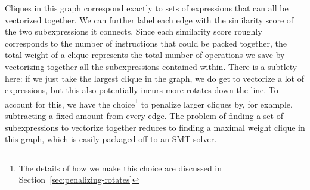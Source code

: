 Cliques in this graph correspond exactly to sets of expressions that can all be vectorized together. 
We can further label each edge with the similarity score of the two subexpressions it connects.
Since each similarity score roughly corresponds to the number of instructions that could be packed together, the total weight of a clique represents the total number of operations we save by vectorizing together all the subexpressions contained within. 
There is a subtlety here: if we just take the largest clique in the graph, we do get to vectorize a lot of expressions, but this also potentially incurs more rotates down the line.
To account for this, we have the choice\footnote{The details of how we make this choice are discussed in Section~\ref{sec:penalizing-rotates}} to penalize larger cliques by, for example, subtracting a fixed amount from every edge.
The problem of finding a set of subexpressions to vectorize together reduces to finding a maximal weight clique in this graph, which is easily packaged off to an SMT solver.

